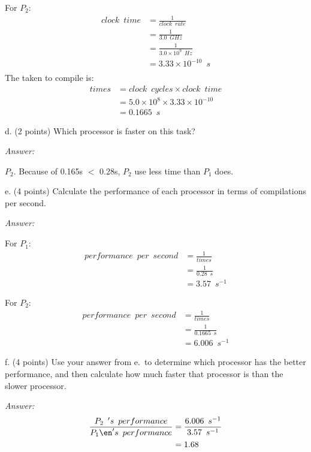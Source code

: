 \documentclass[11pt]{article}
\newcommand{\answer}{{\color{red}\textit{Answer: }}}
\begin{document}
For $P_2$:
\begin{align*}
    clock\enspace time &= \frac{1}{clock \enspace rate} \\
                       &= \frac{1}{3.0 \enspace GHz} \\
                       &= \frac{1}{3.0 \times 10^{9} \enspace Hz} \\
                       &= 3.33 \times 10^{-10} \enspace s \\
\end{align*}
The taken to compile is:
\begin{align*}
    times &= clock \enspace cycles \times clock\enspace time\\
          &= 5.0 \times 10^{8} \times 3.33 \times 10^{-10}\\
          &= 0.1665 \enspace s
\end{align*}

d. (2 points) Which processor is faster on this task?

\answer

$P_2$. Because of 0.165s $<$ 0.28s, $P_2$ use less time than $P_1$ does.

e. (4 points) Calculate the performance of each processor in terms of compilations per second.

\answer

For $P_1$:
\begin{align*}
    performance \enspace per  \enspace second 
          &= \frac{1}{times}\\
          &= \frac{1}{0.28 \enspace s}\\
          &= 3.57 \enspace s^{-1}
\end{align*}

For $P_2$:
\begin{align*}
    performance \enspace per  \enspace second 
          &= \frac{1}{times}\\
          &= \frac{1}{0.1665 \enspace s}\\
          &= 6.006 \enspace s^{-1}
\end{align*}

f. (4 points) Use your answer from e.\ to determine which processor has the better performance, and then calculate how much faster that processor is than the slower processor.

\answer
\begin{align*}
    \frac{P_2 \enspace 's \enspace performance}{P_1 \en 's \enspace performance}
          &= \frac{6.006 \enspace s^{-1}}{3.57 \enspace s^{-1}}\\
          &= 1.68
\end{align*}
\end{document}
